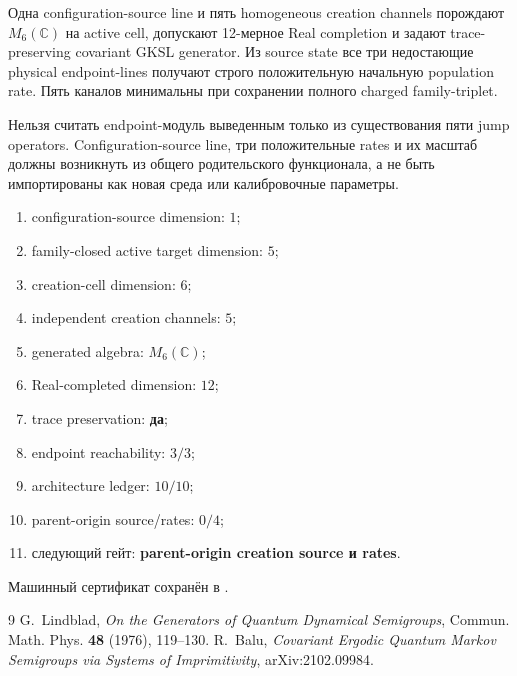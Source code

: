 \begin{theorem}
Одна configuration-source line и пять homogeneous creation channels
порождают $M_6(\mathbb C)$ на active cell, допускают 12-мерное Real
completion и задают trace-preserving covariant GKSL generator. Из source
state все три недостающие physical endpoint-lines получают строго
положительную начальную population rate. Пять каналов минимальны при
сохранении полного charged family-triplet.
\end{theorem}

\begin{nogocriterion}
Нельзя считать endpoint-модуль выведенным только из существования пяти
jump operators. Configuration-source line, три положительные rates и их
масштаб должны возникнуть из общего родительского функционала, а не быть импортированы как
новая среда или калибровочные параметры.
\end{nogocriterion}

\begin{protocol}\begin{enumerate}
\item configuration-source dimension: \textbf{$1$};
\item family-closed active target dimension: \textbf{$5$};
\item creation-cell dimension: \textbf{$6$};
\item independent creation channels: \textbf{$5$};
\item generated algebra: \textbf{$M_6(\mathbb C)$};
\item Real-completed dimension: \textbf{$12$};
\item trace preservation: \textbf{да};
\item endpoint reachability: \textbf{$3/3$};
\item architecture ledger: \textbf{$10/10$};
\item parent-origin source/rates: \textbf{$0/4$};
\item следующий гейт: \textbf{parent-origin creation source и rates}.
\end{enumerate}\end{protocol}

Машинный сертификат сохранён в
.

\begin{thebibliography}{9}
G.~Lindblad, \emph{On the Generators of Quantum Dynamical Semigroups},
Commun. Math. Phys. \textbf{48} (1976), 119--130.
R.~Balu, \emph{Covariant Ergodic Quantum Markov Semigroups via Systems of
Imprimitivity}, arXiv:2102.09984.
\end{thebibliography}
